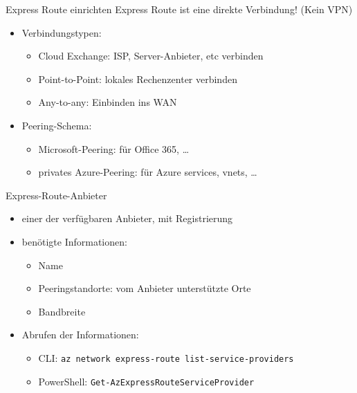 \begin{flashcard}[Definition]{Express Route einrichten}
    Express Route ist eine direkte Verbindung! (Kein VPN)
    \begin{itemize}
        \item Verbindungstypen:
            \begin{itemize}
                \item Cloud Exchange: ISP, Server-Anbieter, etc verbinden
                \item Point-to-Point: lokales Rechenzenter verbinden
                \item Any-to-any: Einbinden ins WAN
            \end{itemize}
        \item Peering-Schema:
            \begin{itemize}
                \item Microsoft-Peering: für Office 365, \ldots
                \item privates Azure-Peering: für Azure services, vnets, \ldots
            \end{itemize}
    \end{itemize}
\end{flashcard}

\begin{flashcard}[Definition]{Express-Route-Anbieter}
    \begin{itemize}
        \item einer der verfügbaren Anbieter, mit Registrierung
        \item benötigte Informationen:
            \begin{itemize}
                \item Name
                \item Peeringstandorte: vom Anbieter unterstützte Orte
                \item Bandbreite
            \end{itemize}
        \item Abrufen der Informationen:
            \begin{itemize}
                \item CLI:\newline
                    \texttt{az network express-route list-service-providers}
                \item PowerShell:\newline
                    \texttt{Get-AzExpressRouteServiceProvider}
            \end{itemize}
    \end{itemize}
\end{flashcard}

